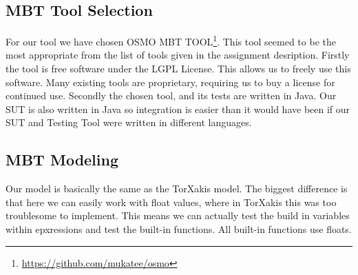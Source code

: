 \documentclass[11pt,a4paper]{article}
\begin{document}
\subsection{MBT Tool Selection}

For our tool we have chosen OSMO MBT
TOOL\footnote{\url{https://github.com/mukatee/osmo}}.
This tool seemed to be the most appropriate from the list of tools
given in the assignment desription.
Firstly the tool is free software under the LGPL License. This allows
us to freely use this software. Many existing tools are proprietary,
requiring us to buy a license for continued use.
Secondly the chosen tool, and its tests are written in Java. Our SUT
is also written in Java so integration is easier than it would have
been if our SUT and Testing Tool were written in different languages.

\subsection{MBT Modeling}

Our model is basically the same as the TorXakis model. The biggest difference is that here we can easily work with float values, where in TorXakis this was too troublesome to implement. This means we can actually test the build in variables within epxressions and test the built-in functions. All built-in functions use floats.
\end{document}
